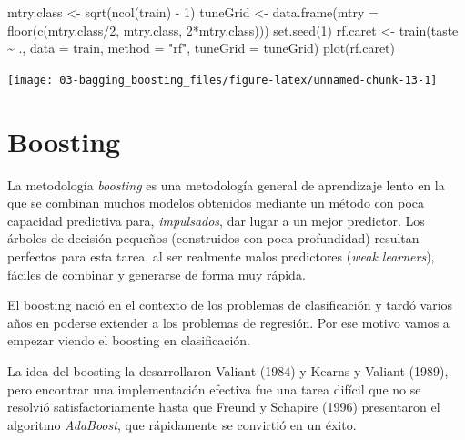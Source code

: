 \documentclass[
]{book}
\newenvironment{Shaded}{\begin{snugshade}}{\end{snugshade}}
\newcommand{\AttributeTok}[1]{\textcolor[rgb]{0.77,0.63,0.00}{#1}}
\newcommand{\DecValTok}[1]{\textcolor[rgb]{0.00,0.00,0.81}{#1}}
\newcommand{\FunctionTok}[1]{\textcolor[rgb]{0.00,0.00,0.00}{#1}}
\newcommand{\NormalTok}[1]{#1}
\newcommand{\OtherTok}[1]{\textcolor[rgb]{0.56,0.35,0.01}{#1}}
\newcommand{\SpecialCharTok}[1]{\textcolor[rgb]{0.00,0.00,0.00}{#1}}
\newcommand{\StringTok}[1]{\textcolor[rgb]{0.31,0.60,0.02}{#1}}
\theoremstyle{break}
\theoremstyle{definition}
\theoremstyle{definition}
\theoremstyle{definition}
\theoremstyle{definition}
\theoremstyle{remark}
\begin{document}
\begin{Shaded}
\begin{Highlighting}[]
\NormalTok{mtry.class }\OtherTok{\textless{}{-}} \FunctionTok{sqrt}\NormalTok{(}\FunctionTok{ncol}\NormalTok{(train) }\SpecialCharTok{{-}} \DecValTok{1}\NormalTok{)}
\NormalTok{tuneGrid }\OtherTok{\textless{}{-}} \FunctionTok{data.frame}\NormalTok{(}\AttributeTok{mtry =} \FunctionTok{floor}\NormalTok{(}\FunctionTok{c}\NormalTok{(mtry.class}\SpecialCharTok{/}\DecValTok{2}\NormalTok{, mtry.class, }\DecValTok{2}\SpecialCharTok{*}\NormalTok{mtry.class)))}
\FunctionTok{set.seed}\NormalTok{(}\DecValTok{1}\NormalTok{)}
\NormalTok{rf.caret }\OtherTok{\textless{}{-}} \FunctionTok{train}\NormalTok{(taste }\SpecialCharTok{\textasciitilde{}}\NormalTok{ ., }\AttributeTok{data =}\NormalTok{ train,}
                  \AttributeTok{method =} \StringTok{"rf"}\NormalTok{, }\AttributeTok{tuneGrid =}\NormalTok{ tuneGrid)}
\FunctionTok{plot}\NormalTok{(rf.caret)}
\end{Highlighting}
\end{Shaded}

\begin{center}\texttt{[image: 03-bagging\_boosting\_files/figure-latex/unnamed-chunk-13-1]} \end{center}

\hypertarget{boosting}{%
\section{Boosting}\label{boosting}}

La metodología \emph{boosting} es una metodología general de aprendizaje lento en la que se combinan muchos modelos obtenidos mediante un método con poca capacidad predictiva para, \emph{impulsados}, dar lugar a un mejor predictor. Los árboles de decisión pequeños (construidos con poca profundidad) resultan perfectos para esta tarea, al ser realmente malos predictores (\emph{weak learners}), fáciles de combinar y generarse de forma muy rápida.

El boosting nació en el contexto de los problemas de clasificación y tardó varios años en poderse extender a los problemas de regresión. Por ese motivo vamos a empezar viendo el boosting en clasificación.

La idea del boosting la desarrollaron Valiant (1984) y Kearns y Valiant (1989), pero encontrar una implementación efectiva fue una tarea difícil que no se resolvió satisfactoriamente hasta que Freund y Schapire (1996) presentaron el algoritmo \emph{AdaBoost}, que rápidamente se convirtió en un éxito.
\end{document}

